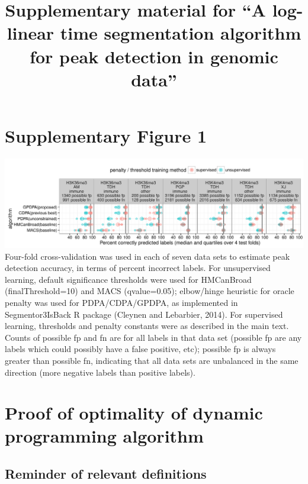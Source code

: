 \documentclass{article}
\title{Supplementary material for ``A log-linear time segmentation algorithm for peak detection in genomic data''}
\begin{document}
\maketitle

\section*{Supplementary Figure 1}
\includegraphics[width=\textwidth]{figure-test-error-dots-supp}
Four-fold cross-validation was used in each of seven data sets to
estimate peak detection accuracy, in terms of percent incorrect
labels. For unsupervised learning, default significance thresholds
were used for HMCanBroad (finalThreshold=10) and MACS (qvalue=0.05);
elbow/hinge heuristic for oracle penalty was used for PDPA/CDPA/GPDPA,
as implemented in Segmentor3IsBack R package (Cleynen and Lebarbier,
2014). For supervised learning, thresholds and penalty constants were
as described in the main text. Counts of possible fp and fn are for
all labels in that data set (possible fp are any labels which could
possibly have a false positive, etc); possible fp is always greater
than possible fn, indicating that all data sets are unbalanced in the
same direction (more negative labels than positive labels).

\section{Proof of optimality of dynamic programming algorithm}

\subsection{Reminder of relevant definitions}
\end{document}
